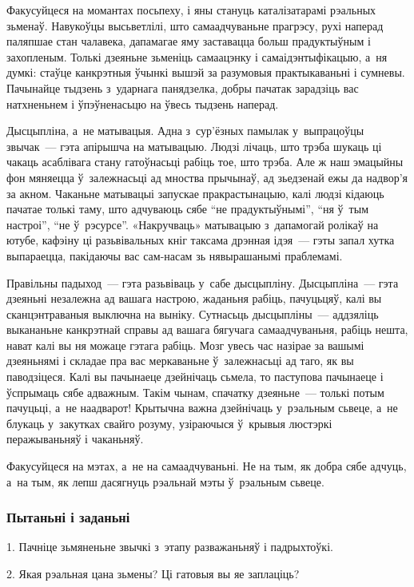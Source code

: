 Факусуйцеся на момантах посьпеху, і яны стануць каталізатарамі рэальных зьменаў. Навукоўцы высьветлілі, што самаадчуваньне прагрэсу, рухі наперад паляпшае стан чалавека, дапамагае яму заставацца больш прадуктыўным і захопленым. Толькі дзеяньне зьменіць самаацэнку і самаідэнтыфікацыю, а~ня думкі: стаўце канкрэтныя ўчынкі вышэй за разумовыя практыкаваньні і сумневы. Пачынайце тыдзень з~ударнага панядзелка, добры пачатак зарадзіць вас натхненьнем і ўпэўненасьцю на ўвесь тыдзень наперад.

Дысцыпліна, а~не матывацыя. Адна з~сур'ёзных памылак у~выпрацоўцы звычак~--- гэта апірышча на матывацыю. Людзі лічаць, што трэба шукаць ці чакаць асаблівага стану гатоўнасьці рабіць тое, што трэба. Але ж наш эмацыйны фон мяняецца ў~залежнасьці ад мноства прычынаў, ад зьедзенай ежы да надвор'я за акном. Чаканьне матывацыі запускае пракрастынацыю, калі людзі кідаюць пачатае толькі таму, што адчуваюць сябе ``не прадуктыўнымі'', ``ня ў~тым настроі'', ``не ў~рэсурсе''. «Накручваць» матывацыю з~дапамогай ролікаў на ютубе, кафэіну ці разьвівальных кніг таксама дрэнная ідэя~--- гэты запал хутка выпараецца, пакідаючы вас сам-насам зь нявырашанымі праблемамі.

Правільны падыход~--- гэта разьвіваць у~сабе дысцыпліну. Дысцыпліна~--- гэта дзеяньні незалежна ад вашага настрою, жаданьня рабіць, пачуцьцяў, калі вы сканцэнтраваныя выключна на выніку. Сутнасьць дысцыпліны~--- аддзяліць выкананьне канкрэтнай справы ад вашага бягучага самаадчуваньня, рабіць нешта, нават калі вы ня можаце гэтага рабіць. Мозг увесь час назірае за вашымі дзеяньнямі і складае пра вас меркаваньне ў~залежнасьці ад таго, як вы паводзіцеся. Калі вы пачынаеце дзейнічаць сьмела, то паступова пачынаеце і ўспрымаць сябе адважным. Такім чынам, спачатку дзеяньне~--- толькі потым пачуцьці, а~не наадварот! Крытычна важна дзейнічаць у~рэальным сьвеце, а~не блукаць у~закутках свайго розуму, узіраючыся ў~крывыя люстэркі перажываньняў і чаканьняў. 

Факусуйцеся на мэтах, а~не на самаадчуваньні. Не на тым, як добра сябе адчуць, а~на тым, як лепш дасягнуць рэальнай мэты ў~рэальным сьвеце.

\subsubsection{Пытаньні і заданьні}

1. Пачніце зьмяненьне звычкі з~этапу разважаньняў і падрыхтоўкі.

2. Якая рэальная цана зьмены? Ці гатовыя вы яе заплаціць?

